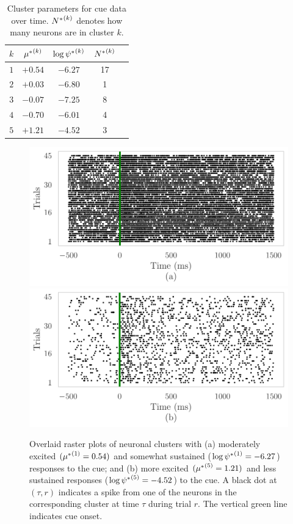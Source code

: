 \documentclass[twoside]{article}
\begin{document}
\begin{table}[h]
\vspace{-3mm}
\caption{Cluster parameters for cue data over time.  ${N^*}^{(k)}_{}$ denotes how many neurons are in cluster $k$.} \label{sample-table} \label{cue-table}
\begin{center}
\begin{tabular}{c|cccl}
$k$ & ${\mu^*}^{(k)}_{}$ & $\log {\psi^*}^{(k)}_{}$ &${N^*}^{(k)}_{}$ \\
\hline
$1$ & $+0.54$ & $-6.27$ & 17  \\
$2$ &$+0.03$ & $-6.80$ & 1 \\
$3$ &$-0.07$ & $-7.25$  & 8 \\
$4$ &$-0.70$ & $-6.01$ & 4 \\
$5$ &$+1.21$ & $-4.52$ & 3 
\end{tabular}
\vspace{-4mm}
\end{center}\end{table}   

\begin{figure}[h]
\begin{center}
\includegraphics[scale=0.5]{../img/cue-raster-a.pdf}
\includegraphics[scale=0.5]{../img/cue-raster-b.pdf}
\end{center}
\vspace{-4mm}
\caption{Overlaid raster plots of neuronal clusters with (a) moderately excited $({\mu^*}^{(1)}_{} = 0.54)$ and somewhat sustained ($\log {\psi^*}^{(1)}_{} = -6.27$) responses to the cue; and (b) more excited $({\mu^*}^{(5)}_{} = 1.21)$ and less sustained responses ($\log {\psi^*}^{(5)}_{} = -4.52$) to the cue.  A black dot at $(\tau, r)$ indicates a spike from one of the neurons in the corresponding cluster at time $\tau$ during trial $r$. The vertical green line indicates cue onset.} \label{cue-rasters}
\end{figure}
\end{document}
